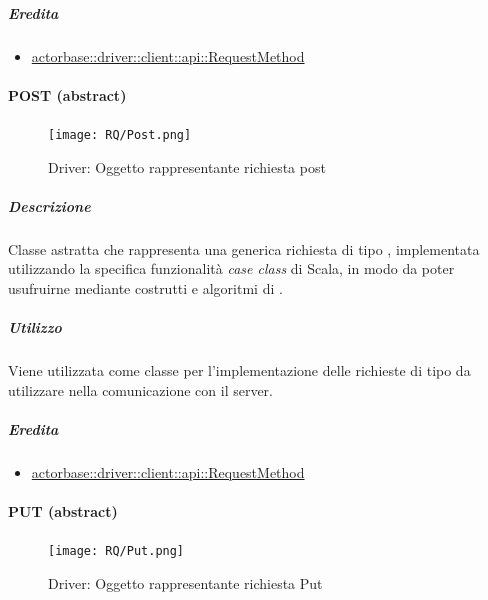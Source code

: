 \documentclass{scalatekids-article}
\begin{document}
\subparagraph{Eredita}

\begin{itemize}
\item \hyperref[sec:actorbase::driver::client::api::RequestMethod]{actorbase::driver::client::api::RequestMethod}
\end{itemize}


\paragraph{POST (abstract)}
\label{sec:actorbase::driver::client::api::POST}

\begin{figure}[H]
  \begin{center}
    \texttt{[image: RQ/Post.png]}
    \caption{Driver: Oggetto rappresentante richiesta post}
  \end{center}
\end{figure}

\subparagraph{Descrizione}

Classe astratta che rappresenta una generica richiesta  di tipo
, implementata utilizzando la specifica funzionalità \textit{case
  class} di Scala, in modo da poter usufruirne mediante costrutti e algoritmi di
.

\subparagraph{Utilizzo}

Viene utilizzata come classe per l'implementazione delle richieste 
di tipo  da utilizzare nella comunicazione con il server.

\subparagraph{Eredita}

\begin{itemize}
\item \hyperref[sec:actorbase::driver::client::api::RequestMethod]{actorbase::driver::client::api::RequestMethod}
\end{itemize}


\paragraph{PUT (abstract)}
\label{sec:actorbase::driver::client::api::PUT}

\begin{figure}[H]
  \begin{center}
    \texttt{[image: RQ/Put.png]}
    \caption{Driver: Oggetto rappresentante richiesta Put}
  \end{center}
\end{figure}
\end{document}
